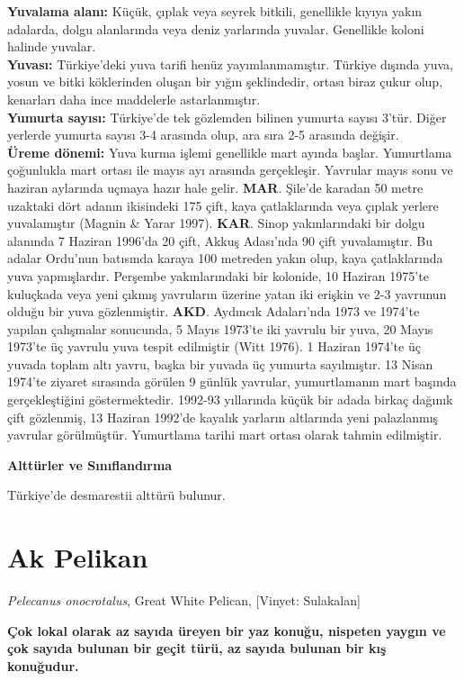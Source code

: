 \documentclass[
  letterpaper,
  DIV=11,
  numbers=noendperiod]{scrreprt}
\begin{document}
\textbf{Yuvalama alanı:} Küçük, çıplak veya seyrek bitkili, genellikle
kıyıya yakın adalarda, dolgu alanlarında veya deniz yarlarında yuvalar.
Genellikle koloni halinde yuvalar.\\
\textbf{Yuvası:} Türkiye'deki yuva tarifi henüz yayımlanmamıştır.
Türkiye dışında yuva, yosun ve bitki köklerinden oluşan bir yığın
şeklindedir, ortası biraz çukur olup, kenarları daha ince maddelerle
astarlanmıştır.\\
\textbf{Yumurta sayısı:} Türkiye'de tek gözlemden bilinen yumurta sayısı
3'tür. Diğer yerlerde yumurta sayısı 3-4 arasında olup, ara sıra 2-5
arasında değişir.\\
\textbf{Üreme dönemi:} Yuva kurma işlemi genellikle mart ayında başlar.
Yumurtlama çoğunlukla mart ortası ile mayıs ayı arasında gerçekleşir.
Yavrular mayıs sonu ve haziran aylarında uçmaya hazır hale gelir.
\textbf{MAR}. Şile'de karadan 50 metre uzaktaki dört adanın ikisindeki
175 çift, kaya çatlaklarında veya çıplak yerlere yuvalamıştır (Magnin \&
Yarar 1997). \textbf{KAR}. Sinop yakınlarındaki bir dolgu alanında 7
Haziran 1996'da 20 çift, Akkuş Adası'nda 90 çift yuvalamıştır. Bu adalar
Ordu'nun batısında karaya 100 metreden yakın olup, kaya çatlaklarında
yuva yapmışlardır. Perşembe yakınlarındaki bir kolonide, 10 Haziran
1975'te kuluçkada veya yeni çıkmış yavruların üzerine yatan iki erişkin
ve 2-3 yavrunun olduğu bir yuva gözlenmiştir. \textbf{AKD}. Aydıncık
Adaları'nda 1973 ve 1974'te yapılan çalışmalar sonucunda, 5 Mayıs
1973'te iki yavrulu bir yuva, 20 Mayıs 1973'te üç yavrulu yuva tespit
edilmiştir (Witt 1976). 1 Haziran 1974'te üç yuvada toplam altı yavru,
başka bir yuvada üç yumurta sayılmıştır. 13 Nisan 1974'te ziyaret
sırasında görülen 9 günlük yavrular, yumurtlamanın mart başında
gerçekleştiğini göstermektedir. 1992-93 yıllarında küçük bir adada
birkaç dağınık çift gözlenmiş, 13 Haziran 1992'de kayalık yarların
altlarında yeni palazlanmış yavrular görülmüştür. Yumurtlama tarihi mart
ortası olarak tahmin edilmiştir.

\textbf{Alttürler ve Sınıflandırma}

Türkiye'de desmarestii alttürü bulunur.

\section{Ak Pelikan}\label{ak-pelikan}

\emph{Pelecanus onocrotalus}, Great White Pelican, {[}Vinyet:
Sulakalan{]}

\textbf{Çok lokal olarak az sayıda üreyen bir yaz konuğu, nispeten
yaygın ve çok sayıda bulunan bir geçit türü, az sayıda bulunan bir kış
konuğudur.}
\end{document}
